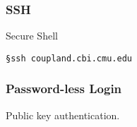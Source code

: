 \begin{frame}[fragile]
\frametitle{SSH}
\begin{block}{Secure Shell}
\begin{verbatim}
§ssh coupland.cbi.cmu.edu
\end{verbatim}
\end{block}
\end{frame}

\begin{frame}[fragile]
\frametitle{Password-less Login}
Public key authentication.
\end{frame}


